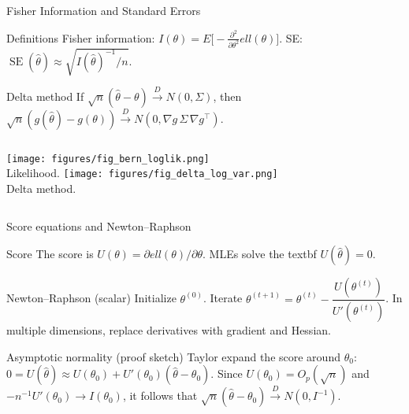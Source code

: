 \documentclass{beamer}
\def\E{E}%
\def\ell{ell}%
\def\mathbb#1{#1}%
\def\mathcal#1{#1}%
\newcommand{\E}{\mathbb{E}}
\newcommand{\1}{\mathbf{1}}
\newcommand{\tod}{\xrightarrow{\,\mathcal{D}\,}}
\newcommand{\robustcmd}[1]{\csname #1\endcsname}
\providecommand{\textbf}[1]{\robustcmd{textbf}{#1}}
\begin{document}
\begin{frame}{Fisher Information and Standard Errors}
  \begin{block}{Definitions}
    Fisher information: \(I(\theta) = \E\big[-\tfrac{\partial^2}{\partial\theta^2} \ell(\theta)\big]\). SE: \(\operatorname{SE}(\hat\theta) \approx \sqrt{I(\hat\theta)^{-1}/n}.\)
  \end{block}
  \begin{block}{Delta method}
    \small If \(\sqrt{n}(\hat\theta-\theta)\tod\mathcal N(0,\Sigma)\), then \(\sqrt{n}(g(\hat\theta)-g(\theta))\tod\mathcal N(0,\nabla g\,\Sigma\,\nabla g^\top).\)
  \end{block}
  \begin{exampleblock}{}
    \begin{columns}[T]
      {\centering\texttt{[image: figures/fig\_bern\_loglik.png]}\\[-1em]
      \scriptsize Likelihood.}
      {\centering\texttt{[image: figures/fig\_delta\_log\_var.png]}\\[-1em]
      \scriptsize Delta method.}
    \end{columns}
  \end{exampleblock}
\end{frame}

\begin{frame}{Score equations and Newton--Raphson}
  \begin{block}{Score}
    The score is \(U(\theta)=\partial \ell(\theta)/\partial\theta\). MLEs solve the \textbf{score equations} \(U(\hat\theta)=0\).
  \end{block}
  \begin{exampleblock}{Newton--Raphson (scalar)}
    Initialize \(\theta^{(0)}\). Iterate \(\theta^{(t+1)} = \theta^{(t)} - \dfrac{U(\theta^{(t)})}{U'(\theta^{(t)})}\). In multiple dimensions, replace derivatives with gradient and Hessian.
  \end{exampleblock}
  \begin{block}{Asymptotic normality (proof sketch)}
    Taylor expand the score around \(\theta_0\): \(0=U(\hat\theta)\approx U(\theta_0)+U'(\theta_0)(\hat\theta-\theta_0)\). Since \(U(\theta_0)=\mathcal{O}_p(\sqrt n)\) and \(-n^{-1}U'(\theta_0)\to I(\theta_0)\), it follows that \(\sqrt n (\hat\theta-\theta_0)\tod \mathcal N(0, I^{-1})\).
  \end{block}
\end{frame}
\end{document}

